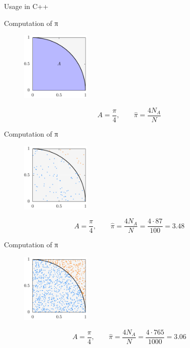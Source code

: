 \documentclass[aspectratio=169]{beamer}
\newcommand{\inputCodeBlock}[1]{%
    \begin{center}
        
    \end{center}
}
\begin{document}
    \begin{frame}{Usage in C++}
      \inputCodeBlock{code/api.cpp}
    \end{frame}

    \begin{frame}{Computation of π}
      \begin{figure}
        \includegraphics[width=0.3\textwidth]{plots/monte_carlo_pi_circle.pdf}
      \end{figure}
      \begin{mybox}
        \[
          A = \frac{π}{4}, \qquad \hat{π} = \frac{4 N_A}{N}
        \]
      \end{mybox}
    \end{frame}

    \begin{frame}{Computation of π}
      \begin{figure}
        \includegraphics[width=0.3\textwidth]{figures/monte_carlo_pi_100_87.pdf}
      \end{figure}
      \begin{mybox}
        \[
          A = \frac{π}{4}, \qquad \hat{π} = \frac{4 N_A}{N} = \frac{4 \cdot 87}{100} = 3.48
        \]
      \end{mybox}
    \end{frame}

    \begin{frame}{Computation of π}
      \begin{figure}
        \includegraphics[width=0.3\textwidth]{figures/monte_carlo_pi_1000_765.pdf}
      \end{figure}
      \begin{mybox}
        \[
          A = \frac{π}{4}, \qquad \hat{π} = \frac{4 N_A}{N} = \frac{4 \cdot 765}{1000} = 3.06
        \]
      \end{mybox}
    \end{frame}
\end{document}
